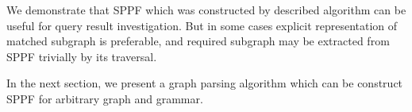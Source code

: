 We demonstrate that SPPF which was constructed by described algorithm can be useful for query result investigation. 
But in some cases explicit representation of matched subgraph is preferable, and required subgraph may be extracted from SPPF trivially by its traversal.

In the next section, we present a graph parsing algorithm which can be construct SPPF for arbitrary graph and grammar.